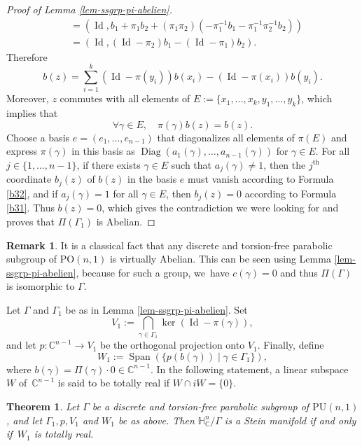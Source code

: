 \documentclass[11pt]{article}
\newtheorem{theorem}{Theorem}[section]
\theoremstyle{definition}
\newtheorem*{remark}{Remark}
\newcommand{\C}{\mathbb{C}}
\newcommand{\HNC}{\mathbb{H}^{n}_{\C}}
\newcommand{\PU}{\mathrm{PU}}
\newcommand{\PO}{\mathrm{PO}}
\DeclareMathOperator{\Id}{Id}
\DeclareMathOperator{\Diag}{Diag}
\def\C{\mathbb{C}}
\newcommand{\HNC}{\mathbb{H}^{n}_{\C}}
\newcommand{\PU}{\mathrm{PU}}
\begin{document}
\begin{proof}[Proof of Lemma \ref{lem-ssgrp-pi-abelien}]
\begin{align*}
&= (\Id,b_1+\pi_1b_2 +(\pi_1\pi_2)(-\pi_1^{-1}b_1 - \pi_1^{-1}\pi_2^{-1}b_2))\\
&= (\Id,(\Id-\pi_2)b_1-(\Id-\pi_1)b_2).
\end{align*}
Therefore
\begin{equation}\label{b31}
b(z)=\sum_{i=1}^{k}(\Id-\pi(y_i))b(x_i)-(\Id-\pi(x_i))b(y_i).
\end{equation}
Moreover, $z$ commutes with all elements of $E:=\{x_1,\dots,x_k,y_1,\dots,y_k\}$, which implies that
\begin{equation}\label{b32}
\forall \gamma \in E,\quad \pi(\gamma)b(z)=b(z).
\end{equation}
Choose a basis $e=(e_1,\dots,e_{n-1})$ that diagonalizes all elements of $\pi(E)$ and express $\pi(\gamma)$ in this basis as $\Diag(a_1(\gamma),\dots,a_{n-1}(\gamma))$ for $\gamma\in E$. For all $j\in\{1,\dots,n-1\}$, if there exists $\gamma\in E$ such that $a_j(\gamma)\ne 1$, then the $j^{\text{th}}$ coordinate $b_j(z)$ of $b(z)$ in the basis $e$ must vanish according to Formula \eqref{b32}, and if $a_j(\gamma)= 1$ for all $\gamma\in E$, then $b_j(z)=0$ according to Formula \eqref{b31}. Thus $b(z)=0$, which gives the contradiction we were looking for and proves that $\Pi(\Gamma_1)$ is Abelian.
\end{proof}

\begin{remark}
It is a classical fact that any discrete and torsion-free parabolic subgroup of $\PO(n,1)$ is virtually Abelian. This can be seen using Lemma \ref{lem-ssgrp-pi-abelien}, because for such a group, we~have $c(\gamma)=0$ and thus $\Pi(\Gamma)$ is isomorphic to $\Gamma$.
\end{remark}

Let $\Gamma$ and $\Gamma_1$ be as in Lemma \ref{lem-ssgrp-pi-abelien}. Set
\begin{equation*}
V_1:= \bigcap_{\gamma\in \Gamma_1}\ker(\operatorname{Id}-\pi(\gamma)),
\end{equation*} and let $p:\C^{n-1}\to V_1$ be the orthogonal projection onto $V_1$. Finally, define
\begin{equation*}
W_1:= \operatorname{Span}(\{p(b(\gamma)) \mid \gamma\in \Gamma_1\}),
\end{equation*}
where $b(\gamma)=\Pi(\gamma)\cdot 0 \in \C^{n-1}$. In the following statement, a linear subspace~$W$ of~$\C^{n-1}$ is said to be totally real if $W\cap iW=\{0\}$.

\begin{theorem}\label{thm-caracterisation-parab-stein}
Let $\Gamma$ be a discrete and torsion-free parabolic subgroup of $\PU(n,1)$, and let $\Gamma_1,p, V_1$ and $W_1$ be as above. Then $\HNC/\Gamma$ is a Stein manifold if and only if~$W_1$ is totally real.
\end{theorem}
\end{document}
